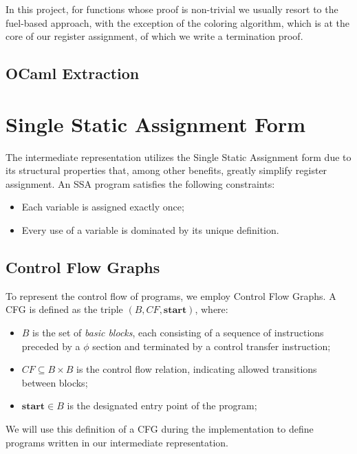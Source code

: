 In this project, for functions whose proof is non-trivial we usually resort to the fuel-based approach, with the exception of the coloring algorithm, which is at the core of our register assignment, of which we write a termination proof.

\subsection{OCaml Extraction}

\section{Single Static Assignment Form}
\label{sec:ssa}

The intermediate representation utilizes the Single Static Assignment form due to its structural properties that, among other benefits, greatly simplify register assignment. An SSA program satisfies the following constraints:

\begin{itemize}
    \item Each variable is assigned exactly once;
    \item Every use of a variable is dominated by its unique definition.
\end{itemize}

\subsection{Control Flow Graphs}
\label{subsec:cfg}

To represent the control flow of programs, we employ Control Flow Graphs. A CFG is defined as the triple $(B, CF, \textbf{start})$, where:

\begin{itemize}
    \item $B$ is the set of \textit{basic blocks}, each consisting of a sequence of instructions preceded by a $\phi$ section and terminated by a control transfer instruction;
    \item $CF \subseteq B \times B$ is the control flow relation, indicating allowed transitions between blocks;
    \item $\textbf{start} \in B$ is the designated entry point of the program;
\end{itemize}

We will use this definition of a CFG during the implementation to define programs written in our intermediate representation.


